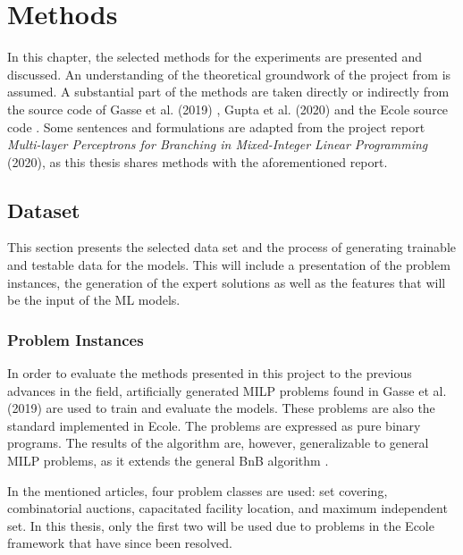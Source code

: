 \chapter{Methods}\label{cha:methods}

In this chapter, the selected methods for the experiments are presented and discussed.  
An understanding of the theoretical groundwork of the project from  is assumed. A substantial part of the methods are taken directly or indirectly from the source code of Gasse et al. (2019) \cite{gasse2019exact}, Gupta et al. (2020) \cite{gupta2020hybrid} and the \gls{Ecole} source code \cite{prouvost2020ecole}. Some sentences and formulations are adapted from the project report \textit{Multi-layer Perceptrons for Branching in Mixed-Integer Linear Programming} (2020), as this thesis shares methods with the aforementioned report. 


\section{Dataset}\label{sec:dataset}

This section presents the selected data set and the process of generating trainable and testable data for the models. 
This will include a presentation of the problem instances, the generation of the expert solutions as well as the features that will be the input of the \gls{ML} models. 



\subsection{Problem Instances}\label{ssec:probleminstances}

In order to evaluate the methods presented in this project to the previous advances in the field, artificially generated \gls{MILP} problems found in Gasse et al. (2019) \cite{gasse2019exact} are used to train and evaluate the models. These problems are also the standard implemented in \gls{Ecole}.
The problems are expressed as pure binary programs. The results of the algorithm are, however, generalizable to general \gls{MILP} problems, as it extends the general \gls{BnB} algorithm \cite{gasse2019exact}. 

In the mentioned articles, four problem classes are used: set covering, combinatorial auctions, capacitated facility location, and maximum independent set. In this thesis, only the first two will be used due to problems in the \gls{Ecole} framework that have since been resolved. 


